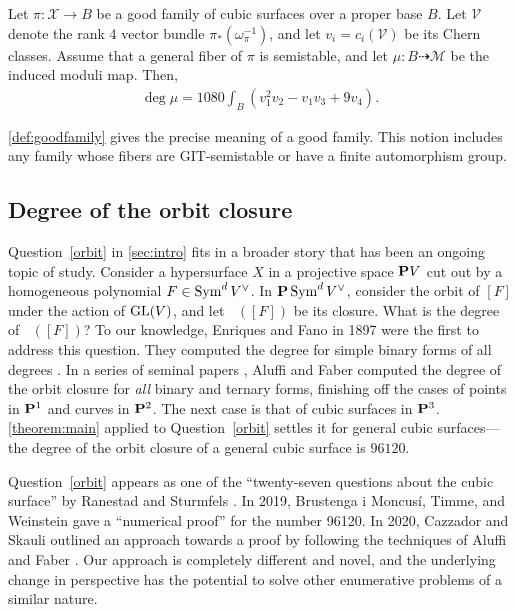 \documentclass[12pt,reqno]{amsart}
\DeclareMathOperator{\Orb}{\overline{Orb}}
\renewcommand{\to}{{\longrightarrow}}
\numberwithin{equation}{section}
\newcommand{\V}{\mathcal V}
\newcommand{\cX}{\mathcal{X}}
\begin{document}
\begin{theorem}\label{theorem:main}
  Let $\pi \colon \cX \to B$ be a good family of cubic surfaces over a
  proper base $B$.
  Let $\V$ denote the rank 4 vector bundle
  $ \pi_* \left(\omega_\pi^{-1}\right)$, and let
  \(v_i = c_i\left(\V\right)\) be its Chern classes.  Assume that a
  general fiber of $\pi$ is semistable, and let
  $\mu \colon B \dashrightarrow \mathcal M$ be the induced moduli map.  Then,
  \begin{align}
    \deg \mu =
    \label{eq:MAIN}
    1080 \int_{B} \left(v_{1}^{2}v_{2} - v_{1}v_{3}+ 9v_{4}\right).
  \end{align}
\end{theorem}
\autoref{def:goodfamily} gives the precise meaning of a good family.
This notion includes any family whose fibers are GIT-semistable or
have a finite automorphism group.

\subsection{Degree of the orbit closure}
Question~\ref{orbit} in \autoref{sec:intro} fits in a broader story
that has been an ongoing topic of study.  Consider a hypersurface
\(X\) in a projective space $\P V$ cut out by a homogeneous polynomial
$F \in \Sym^d V^\vee$.  In $\P\Sym^dV^\vee$, consider the orbit of
$[F]$ under the action of $\GL(V)$, and let $\Orb([F])$ be its
closure.  What is the degree of $\Orb([F])$?  To our knowledge,
Enriques and Fano in 1897 were the first to address this question.
They computed the degree for simple binary forms of all degrees
\cite{enr.fan:97}.  In a series of seminal papers \cite{Aluffi1993,
  alu.fab:93, alu.fab:00}, Aluffi and Faber computed the degree of the
orbit closure for \emph{all} binary and ternary forms, finishing off
the cases of points in $\P^1$ and curves in $\P^2$.  The next case is
that of cubic surfaces in $\P^3$.  \autoref{theorem:main} applied to
Question~\ref{orbit} settles it for general cubic surfaces---the
degree of the orbit closure of a general cubic surface is $96120$.

Question~\ref{orbit} appears as one of the ``twenty-seven questions
about the cubic surface'' by Ranestad and Sturmfels \cite{ran.stu:20}.
In 2019, Brustenga i Moncus\'i, Timme, and Weinstein gave a
``numerical proof'' for the number 96120. In 2020, Cazzador and Skauli
outlined an approach towards a proof by following the techniques of
Aluffi and Faber \cite{bru-i-mon.tim.wei:20,caz.ska:20}.  Our approach
is completely different and novel, and the underlying change in
perspective has the potential to solve other enumerative problems of a
similar nature.
\end{document}
